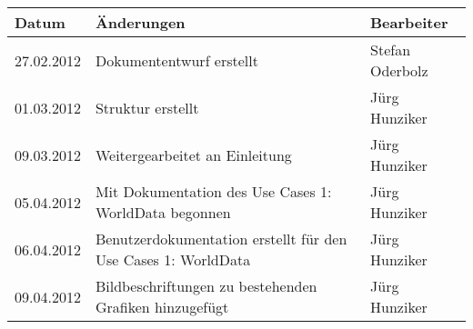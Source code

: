 \begin{longtable}{|p{2cm}|p{10cm}|p{3cm}|}
\hline 
\textbf{Datum} & \textbf{Änderungen} & \textbf{Bearbeiter} \\ 
\hline 
27.02.2012 & Dokumententwurf erstellt & Stefan Oderbolz \\ 
\hline 
01.03.2012 & Struktur erstellt & Jürg Hunziker \\ 
\hline 
09.03.2012 & Weitergearbeitet an Einleitung & Jürg Hunziker \\ 
\hline 
05.04.2012 & Mit Dokumentation des Use Cases 1: WorldData begonnen & Jürg Hunziker \\ 
\hline 
06.04.2012 & Benutzerdokumentation erstellt für den Use Cases 1: WorldData & Jürg Hunziker \\ 
\hline 
09.04.2012 & Bildbeschriftungen zu bestehenden Grafiken hinzugefügt & Jürg Hunziker \\ 
\hline 
\end{longtable} 
